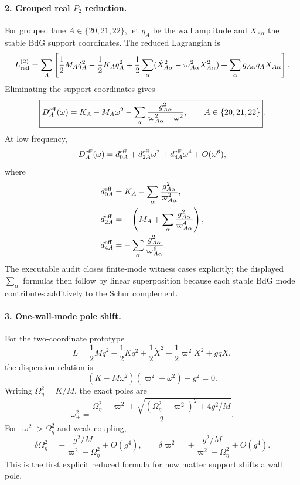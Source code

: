 \paragraph{2. Grouped real \(P_2\) reduction.}
For grouped lane \(A\in\{20,21,22\}\), let \(q_A\) be the wall amplitude and \(X_{A\alpha}\) the stable BdG support coordinates.  The reduced Lagrangian is
\begin{equation}
\label{eq:app-stage003-p2-lagrangian}
L_{\rm red}^{(2)}=
\sum_A\left[
\frac12M_A\dot q_A^2-\frac12K_Aq_A^2
+\frac12\sum_\alpha(\dot X_{A\alpha}^2-\varpi_{A\alpha}^2X_{A\alpha}^2)
+\sum_\alpha g_{A\alpha}q_AX_{A\alpha}
\right].
\end{equation}
Eliminating the support coordinates gives
\begin{equation}
\label{eq:app-stage003-p2-kernel}
\boxed{
D_A^{\rm eff}(\omega)
=K_A-M_A\omega^2-
\sum_\alpha\frac{g_{A\alpha}^2}{\varpi_{A\alpha}^2-\omega^2},
\qquad
A\in\{20,21,22\}}.
\end{equation}
At low frequency,
\begin{equation}
D_A^{\rm eff}(\omega)=d_{0A}^{\rm eff}+d_{2A}^{\rm eff}\omega^2+d_{4A}^{\rm eff}\omega^4+O(\omega^6),
\end{equation}
where
\begin{align}
\label{eq:app-stage003-d0d2d4}
d_{0A}^{\rm eff}&=K_A-\sum_\alpha\frac{g_{A\alpha}^2}{\varpi_{A\alpha}^2},\\
d_{2A}^{\rm eff}&=-\left(M_A+\sum_\alpha\frac{g_{A\alpha}^2}{\varpi_{A\alpha}^4}\right),\\
d_{4A}^{\rm eff}&=-\sum_\alpha\frac{g_{A\alpha}^2}{\varpi_{A\alpha}^6}.
\end{align}
The executable audit closes finite-mode witness cases explicitly; the displayed
\(\sum_\alpha\) formulas then follow by linear superposition because each stable
BdG mode contributes additively to the Schur complement.

\paragraph{3. One-wall-mode pole shift.}
For the two-coordinate prototype
\begin{equation}
L=\frac12M\dot q^2-\frac12Kq^2+\frac12\dot X^2-\frac12\varpi^2X^2+gqX,
\end{equation}
the dispersion relation is
\begin{equation}
\label{eq:app-stage003-dispersion}
(K-M\omega^2)(\varpi^2-\omega^2)-g^2=0.
\end{equation}
Writing \(\Omega_\eta^2=K/M\), the exact poles are
\begin{equation}
\label{eq:app-stage003-poles}
\boxed{
\omega_\pm^2=\frac{\Omega_\eta^2+\varpi^2
\pm\sqrt{(\Omega_\eta^2-\varpi^2)^2+4g^2/M}}{2}}.
\end{equation}
For \(\varpi^2>\Omega_\eta^2\) and weak coupling,
\begin{equation}
\label{eq:app-stage003-pole-shift}
\boxed{
\delta\Omega_\eta^2=-\frac{g^2/M}{\varpi^2-\Omega_\eta^2}+O(g^4),
\qquad
\delta\varpi^2=+\frac{g^2/M}{\varpi^2-\Omega_\eta^2}+O(g^4)}.
\end{equation}
This is the first explicit reduced formula for how matter support shifts a wall pole.

